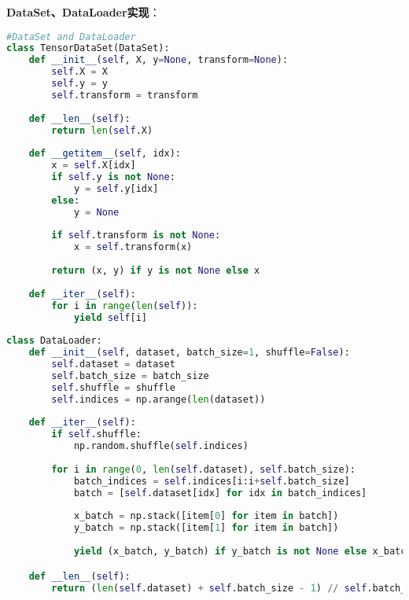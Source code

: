 \documentclass[a4paper, twocolumn]{article}
\begin{document}
\noindent \textbf{DataSet、DataLoader实现}：
\begin{lstlisting}[language=Python]
#DataSet and DataLoader
class TensorDataSet(DataSet):
    def __init__(self, X, y=None, transform=None):
        self.X = X
        self.y = y
        self.transform = transform
    
    def __len__(self):
        return len(self.X)
    
    def __getitem__(self, idx):
        x = self.X[idx]
        if self.y is not None:
            y = self.y[idx]
        else:
            y = None
        
        if self.transform is not None:
            x = self.transform(x)
        
        return (x, y) if y is not None else x
    
    def __iter__(self):
        for i in range(len(self)):
            yield self[i]
    
class DataLoader:
    def __init__(self, dataset, batch_size=1, shuffle=False):
        self.dataset = dataset
        self.batch_size = batch_size
        self.shuffle = shuffle
        self.indices = np.arange(len(dataset))
        
    def __iter__(self):
        if self.shuffle:
            np.random.shuffle(self.indices)
            
        for i in range(0, len(self.dataset), self.batch_size):
            batch_indices = self.indices[i:i+self.batch_size]
            batch = [self.dataset[idx] for idx in batch_indices]
            
            x_batch = np.stack([item[0] for item in batch])
            y_batch = np.stack([item[1] for item in batch])
            
            yield (x_batch, y_batch) if y_batch is not None else x_batch

    def __len__(self):
        return (len(self.dataset) + self.batch_size - 1) // self.batch_size
\end{lstlisting}
\end{document}
